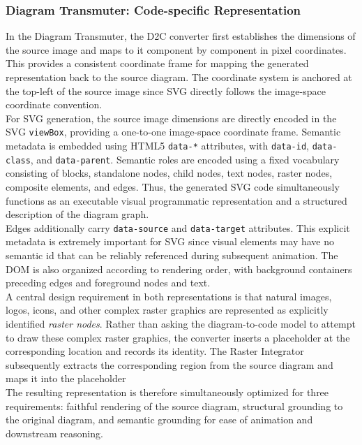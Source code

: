 \documentclass{article} %
\begin{document}
\subsubsection{Diagram Transmuter: Code-specific Representation}
 In the Diagram Transmuter, the D2C converter first establishes the dimensions of the source image and maps to it component by component in pixel coordinates. This provides a consistent coordinate frame for mapping the generated representation back to the source diagram. The coordinate system is anchored at the top-left of the source image since SVG directly follows the image-space coordinate convention.\\
 For SVG generation, the source image dimensions are directly encoded in the SVG \texttt{viewBox}, providing a one-to-one image-space coordinate frame. Semantic metadata is embedded using HTML5 \texttt{data-*} attributes, with \texttt{data-id}, \texttt{data-class}, and \texttt{data-parent}. Semantic roles are encoded using a fixed vocabulary consisting of blocks, standalone nodes, child nodes, text nodes, raster nodes, composite elements, and edges. Thus, the generated SVG code simultaneously functions as an executable visual programmatic representation and a structured description of the diagram graph.\\ Edges additionally carry \texttt{data-source} and \texttt{data-target} attributes. This explicit metadata is extremely important for SVG since visual elements may have no semantic id that can be reliably referenced during subsequent animation. The DOM is also organized according to rendering order, with background containers preceding edges and foreground nodes and text.\\
 A central design requirement in both representations is that natural images, logos, icons, and other complex raster graphics are represented as explicitly identified \textit{raster nodes}. Rather than asking the diagram-to-code model to attempt to draw these complex raster graphics, the converter inserts a placeholder at the corresponding location and records its identity. The Raster Integrator subsequently extracts the corresponding region from the source diagram and maps it into the placeholder\\
 
 The resulting representation is therefore simultaneously optimized for three requirements: faithful rendering of the source diagram, structural grounding to the original diagram, and semantic grounding for ease of animation and downstream reasoning.
\end{document}
